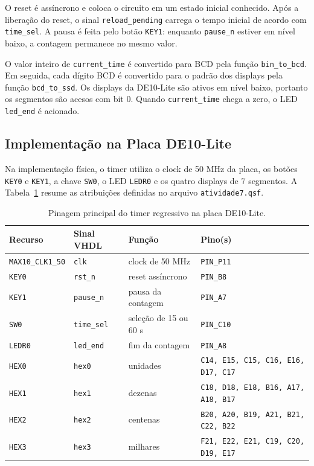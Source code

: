 \documentclass[12pt,a4paper, brazil]{article}
\begin{document}
O reset é assíncrono e coloca o circuito em um estado inicial conhecido. Após a liberação do reset, o sinal \texttt{reload\_pending} carrega o tempo inicial de acordo com \texttt{time\_sel}. A pausa é feita pelo botão \texttt{KEY1}: enquanto \texttt{pause\_n} estiver em nível baixo, a contagem permanece no mesmo valor.

O valor inteiro de \texttt{current\_time} é convertido para BCD pela função \texttt{bin\_to\_bcd}. Em seguida, cada dígito BCD é convertido para o padrão dos displays pela função \texttt{bcd\_to\_ssd}. Os displays da DE10-Lite são ativos em nível baixo, portanto os segmentos são acesos com bit 0. Quando \texttt{current\_time} chega a zero, o LED \texttt{led\_end} é acionado.

\subsection{Implementação na Placa DE10-Lite}

Na implementação física, o timer utiliza o clock de 50 MHz da placa, os botões \texttt{KEY0} e \texttt{KEY1}, a chave \texttt{SW0}, o LED \texttt{LEDR0} e os quatro displays de 7 segmentos. A Tabela~\ref{tab:pinagem} resume as atribuições definidas no arquivo \texttt{atividade7.qsf}.

\begin{table}[H]
\centering
\caption{Pinagem principal do timer regressivo na placa DE10-Lite.}
\label{tab:pinagem}
\small
\begin{tabular}{@{}lll p{5.8cm}@{}}
\toprule
\textbf{Recurso} & \textbf{Sinal VHDL} & \textbf{Função} & \textbf{Pino(s)} \\
\midrule
\texttt{MAX10\_CLK1\_50} & \texttt{clk}      & clock de 50 MHz       & \texttt{PIN\_P11} \\
\texttt{KEY0}            & \texttt{rst\_n}   & reset assíncrono      & \texttt{PIN\_B8}  \\
\texttt{KEY1}            & \texttt{pause\_n} & pausa da contagem     & \texttt{PIN\_A7}  \\
\texttt{SW0}             & \texttt{time\_sel}& seleção de 15 ou 60 s & \texttt{PIN\_C10} \\
\texttt{LEDR0}           & \texttt{led\_end} & fim da contagem       & \texttt{PIN\_A8}  \\
\texttt{HEX0}            & \texttt{hex0}     & unidades              & \texttt{C14, E15, C15, C16, E16, D17, C17} \\
\texttt{HEX1}            & \texttt{hex1}     & dezenas               & \texttt{C18, D18, E18, B16, A17, A18, B17} \\
\texttt{HEX2}            & \texttt{hex2}     & centenas              & \texttt{B20, A20, B19, A21, B21, C22, B22} \\
\texttt{HEX3}            & \texttt{hex3}     & milhares              & \texttt{F21, E22, E21, C19, C20, D19, E17} \\
\bottomrule
\end{tabular}
\end{table}
\FloatBarrier
\end{document}
